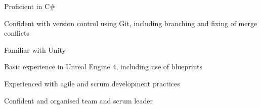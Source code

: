 


\begin{cvparagraph}
    
    \begin{cvitems}
        \text{}
        \item
        \item Proficient in C\# 
        \item Confident with version control using Git, including branching and fixing of merge conflicts
        \item Familiar with Unity
        \item Basic experience in Unreal Engine 4, including use of blueprints
        \item Experienced with agile and scrum development practices
        \item Confident and organised team and scrum leader
    \end{cvitems}

\end{cvparagraph}
